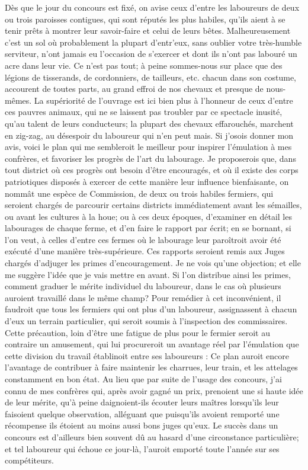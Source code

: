 Dès que le jour du concours est fixé, on avise ceux d'entre les laboureurs de deux ou trois paroisses contigues, qui sont réputés les plus habiles, qu'ils aient à se tenir prêts à montrer leur savoir-faire et celui de leurs bêtes.
Malheureusement c'est un sol où probablement la plupart d'entr'eux, sans oublier votre très-humble serviteur, n'ont jamais eu l'occasion de s'exercer et dont ils n'ont pas labouré un acre dans leur vie. Ce n'est pas tout; à peine sommes-nous sur place que des légions de tisserands, de cordonniers, de tailleurs, etc. chacun dans son costume, accourent de toutes parts, au grand effroi de nos chevaux et presque de nous-mêmes. La supériorité de l'ouvrage est ici bien plus à l'honneur de ceux d'entre ces pauvres animaux, qui ne se laissent pas troubler par ce spectacle inusité, qu'au talent de leurs conducteurs; la plupart des chevaux effarouchés, marchent en zig-zag, au désespoir du laboureur qui n'en peut mais.
\setcounter{page}{143} Si j'osois donner mon avis, voici le plan qui me sembleroit le meilleur pour inspirer l'émulation à mes confrères, et favoriser les progrès de l'art du labourage.
Je proposerois que, dans tout district où ces progrès ont besoin d'être encouragés, et où il existe des corps patriotiques disposés à exercer de cette manière leur influence bienfaisante, on nommât une espèce de Commission, de deux ou trois habiles fermiers, qui seroient chargés de parcourir certains districts immédiatement avant les sémailles, ou avant les cultures à la houe; ou à ces deux époques, d'examiner en détail les labourages de chaque ferme, et d'en faire le rapport par écrit; en se bornant, si l'on veut, à celles d'entre ces fermes où le labourage leur paroîtroit avoir été exécuté d'une manière très-supérieure. Ces rapports seroient remis aux Juges chargés d'adjuger les primes d'encouragement.
Je ne vois qu'une objection; et elle me suggère l'idée que je vais mettre en avant. Si l'on distribue ainsi les primes, comment graduer le mérite individuel du laboureur, dans le cas où plusieurs auroient travaillé dans le même champ? Pour remédier à cet inconvénient, il faudroit que tous les fermiers qui ont plus d'un laboureur, assignassent à chacun d'eux un terrain particulier, qui seroit\setcounter{page}{144} soumis à l'inspection des commissaires. Cette précaution, loin d'être une fatigue de plus pour le fermier seroit au contraire un amusement, qui lui procureroit un avantage réel par l'émulation que cette division du travail établinoit entre ses laboureurs : Ce plan auroit encore l'avantage de contribuer à faire maintenir les charrues, leur train, et les attelages constamment en bon état. Au lieu que par suite de l'usage des concours, j'ai connu de mes confrères qui, après avoir gagné un prix, prenoient une si haute idée de leur mérite, qu'à peine daignoient-ils écouter leurs maîtres lorsqu'ils leur faisoient quelque observation, alléguant que puisqu'ils avoient remporté une récompense ils étoient au moins aussi bons juges qu'eux. Le succès dans un concours est d'ailleurs bien souvent dû au hasard d'une circonstance particulière; et tel laboureur qui échoue ce jour-là, l'auroit emporté toute l'année sur ses compétiteurs.

